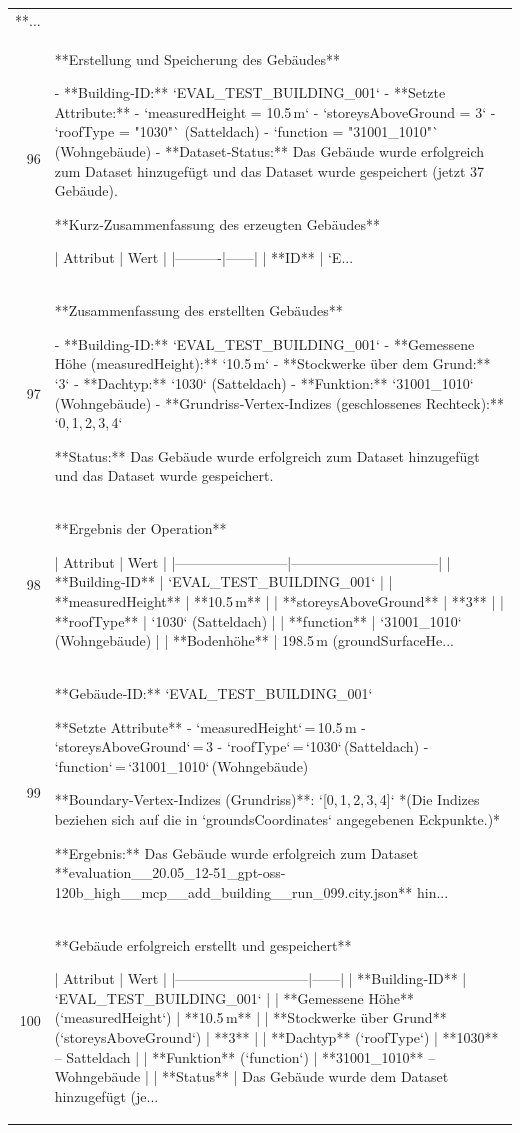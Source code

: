 \documentclass[a4paper,11pt]{article}
\begin{document}
\begin{table}[ht]
\begin{tabular}{r p{12cm}}
**... \\
96 & **Erstellung und Speicherung des Gebäudes**

- **Building‑ID:** `EVAL\_TEST\_BUILDING\_001`  
- **Setzte Attribute:**  
  - `measuredHeight = 10.5 m`  
  - `storeysAboveGround = 3`  
  - `roofType = "1030"` (Satteldach)  
  - `function = "31001\_1010"` (Wohngebäude)  
- **Dataset‑Status:** Das Gebäude wurde erfolgreich zum Dataset hinzugefügt und das Dataset wurde gespeichert (jetzt 37 Gebäude).

**Kurz‑Zusammenfassung des erzeugten Gebäudes**  

| Attribut | Wert |
|----------|------|
| **ID** | `E... \\
97 & **Zusammenfassung des erstellten Gebäudes**

- **Building-ID:** `EVAL\_TEST\_BUILDING\_001`  
- **Gemessene Höhe (measuredHeight):** `10.5 m`  
- **Stockwerke über dem Grund:** `3`  
- **Dachtyp:** `1030` (Satteldach)  
- **Funktion:** `31001\_1010` (Wohngebäude)  
- **Grundriss‑Vertex‑Indizes (geschlossenes Rechteck):** `0, 1, 2, 3, 4`  

**Status:** Das Gebäude wurde erfolgreich zum Dataset hinzugefügt und das Dataset wurde gespeichert. \\
98 & **Ergebnis der Operation**

| Attribut                | Wert                           |
|------------------------|--------------------------------|
| **Building‑ID**        | `EVAL\_TEST\_BUILDING\_001`       |
| **measuredHeight**     | **10.5 m**                     |
| **storeysAboveGround** | **3**                          |
| **roofType**           | `1030` (Satteldach)            |
| **function**           | `31001\_1010` (Wohngebäude)     |
| **Bodenhöhe**          | 198.5 m (groundSurfaceHe... \\
99 & **Gebäude‑ID:** `EVAL\_TEST\_BUILDING\_001`  

**Setzte Attribute**  
- `measuredHeight` = 10.5 m  
- `storeysAboveGround` = 3  
- `roofType` = `1030` (Satteldach)  
- `function` = `31001\_1010` (Wohngebäude)  

**Boundary‑Vertex‑Indizes (Grundriss)**: `[0, 1, 2, 3, 4]`  
*(Die Indizes beziehen sich auf die in `groundsCoordinates` angegebenen Eckpunkte.)*  

**Ergebnis:** Das Gebäude wurde erfolgreich zum Dataset **evaluation\_\_20.05\_12-51\_gpt-oss-120b\_high\_\_mcp\_\_add\_building\_\_run\_099.city.json** hin... \\
100 & **Gebäude erfolgreich erstellt und gespeichert**

| Attribut                     | Wert |
|-----------------------------|------|
| **Building‑ID**             | `EVAL\_TEST\_BUILDING\_001` |
| **Gemessene Höhe** (`measuredHeight`) | **10.5 m** |
| **Stockwerke über Grund** (`storeysAboveGround`) | **3** |
| **Dachtyp** (`roofType`)    | **1030** – Satteldach |
| **Funktion** (`function`)   | **31001\_1010** – Wohngebäude |
| **Status**                  | Das Gebäude wurde dem Dataset hinzugefügt (je... \\
\hline
\end{tabular}
\end{table}

\clearpage
\end{document}
